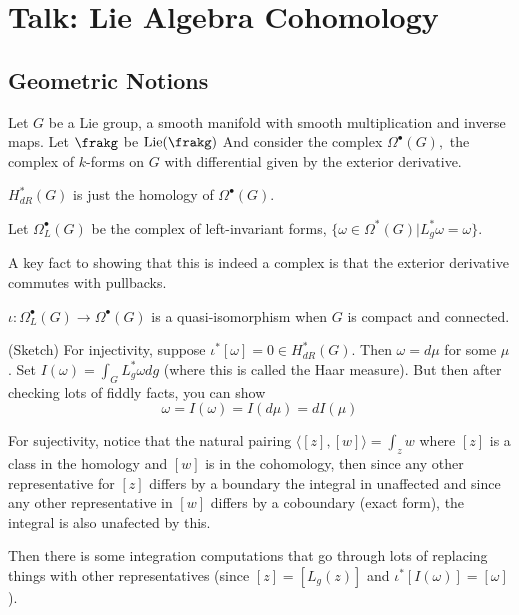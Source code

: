 \documentclass[12pt]{article}
\begin{document}
\section{Talk: Lie Algebra Cohomology}
\subsection{Geometric Notions}
Let $G$ be a Lie group, a smooth manifold with smooth multiplication and inverse maps. Let $\frakg$ be $\operatorname{Lie}(\frakg)$
And consider the complex $\Omega^\bullet(G),$ the complex of $k$-forms on $G$ with differential given by the exterior derivative.

\begin{defn}
	$H^\ast_{dR}(G)$ is just the homology of $\Omega^\bullet(G)$.
\end{defn}

\begin{defn}
	Let $\Omega^\bullet_L(G)$ be the complex of left-invariant forms, $\{\omega\in\Omega^\ast(G)|L_g^\ast\omega=\omega\}$.
\end{defn}
\begin{rmk}
	A key fact to showing that this is indeed a complex is that the exterior derivative commutes with pullbacks.
\end{rmk}

\begin{thm}
	$\iota:\Omega_L^\bullet(G)\to\Omega^\bullet(G)$ is a quasi-isomorphism when $G$ is compact and connected.
\end{thm}
\begin{prf}
	(Sketch) For injectivity, suppose $\iota^\ast[\omega]=0\in H_{dR}^\ast(G)$. Then $\omega=d\mu$ for some $\mu$.
	Set $I(\omega)=\int_G L_g^\ast\omega dg$ (where this is called the Haar measure). But then after checking lots 
	of fiddly facts, you can show 
	\[\omega=I(\omega)=I(d\mu)=dI(\mu)\]

	For sujectivity, notice that the natural pairing $\langle[z],[w]\rangle=\int_z w$ where $[z]$ is a class in the homology  and $[w]$ is in the cohomology,
	then since any other representative for $[z]$ differs by a boundary the integral in unaffected and since any other representative in $[w]$ 
	differs by a coboundary (exact form), the integral is also unafected by this.

	Then there is some integration computations that go through lots of replacing things with other representatives (since $[z]=[L_g(z)]$ and $\iota^\ast[I(\omega)]=[\omega]$).
\end{prf}
\end{document}
